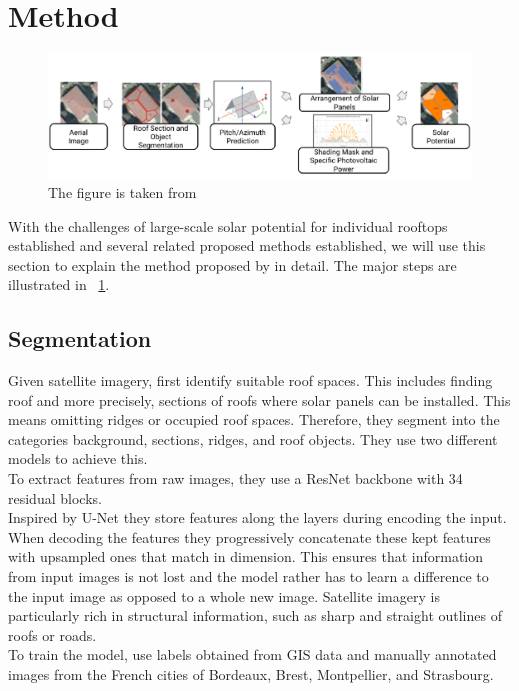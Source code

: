 \documentclass{article} %
\newcommand{\figref}[1]{\figurename~\ref{#1}}
\begin{document}
\section*{Method}
\begin{figure}
	\centering
	\includegraphics[width=\linewidth]{../figures/fig_1.pdf}
	\caption{The figure is taken from \citet{de2021predicting}}
	\label{fig:arch}
\end{figure}
With the challenges of large-scale solar potential for individual rooftops established and several related proposed methods established, we will use this section to explain the method proposed by \citet*{de2021predicting} in detail. The major steps are illustrated in \figref{fig:arch}.\\
\subsection*{Segmentation}
Given satellite imagery, \citet{de2021predicting} first identify suitable roof spaces. This includes finding roof and more precisely, sections of roofs where solar panels can be installed. This means omitting ridges or occupied roof spaces. Therefore, they segment into the categories background, sections, ridges, and roof objects. They use two different models to achieve this. \cite{de2021predicting}\\
To extract features from raw images, they use a ResNet backbone \cite{he2016deep} with 34 residual blocks.\\
Inspired by U-Net \cite{ronneberger2015u} they store features along the layers during encoding the input. When decoding the features they progressively concatenate these kept features with upsampled ones that match in dimension. This ensures that information from input images is not lost and the model rather has to learn a difference to the input image as opposed to a whole new image. Satellite imagery is particularly rich in structural information, such as sharp and straight outlines of roofs or roads.\\
To train the model, \citet{de2021predicting} use labels obtained from GIS data and manually annotated images from the French cities of Bordeaux, Brest, Montpellier, and Strasbourg.
\end{document}
